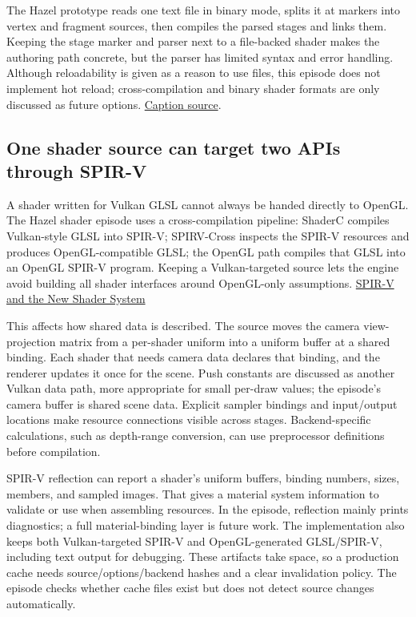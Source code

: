 The Hazel prototype reads one text file in binary mode, splits it at  markers into vertex and fragment sources, then compiles the parsed stages and links them. Keeping the stage marker and parser next to a file-backed shader makes the authoring path concrete, but the parser has limited syntax and error handling. Although reloadability is given as a reason to use files, this episode does not implement hot reload; cross-compilation and binary shader formats are only discussed as future options. \href{https://www.youtube.com/watch?v=8wFEzIYRZXg}{Caption source}.

\subsection{One shader source can target two APIs through SPIR-V}\label{06-engine-ii-ch026-one-shader-source-can-target-two-apis-through-spir-v}

\hypertarget{06-engine-ii-ch026-one-shader-source-can-target-two-apis-through-spir-v}{}

A shader written for Vulkan GLSL cannot always be handed directly to OpenGL. The Hazel shader episode uses a cross-compilation pipeline: ShaderC compiles Vulkan-style GLSL into SPIR-V; SPIRV-Cross inspects the SPIR-V resources and produces OpenGL-compatible GLSL; the OpenGL path compiles that GLSL into an OpenGL SPIR-V program. Keeping a Vulkan-targeted source lets the engine avoid building all shader interfaces around OpenGL-only assumptions. \href{https://www.youtube.com/watch?v=SXDlZRDjtXg}{SPIR-V and the New Shader System}

This affects how shared data is described. The source moves the camera view-projection matrix from a per-shader uniform into a uniform buffer at a shared binding. Each shader that needs camera data declares that binding, and the renderer updates it once for the scene. Push constants are discussed as another Vulkan data path, more appropriate for small per-draw values; the episode's camera buffer is shared scene data. Explicit sampler bindings and input/output locations make resource connections visible across stages. Backend-specific calculations, such as depth-range conversion, can use preprocessor definitions before compilation.

SPIR-V reflection can report a shader's uniform buffers, binding numbers, sizes, members, and sampled images. That gives a material system information to validate or use when assembling resources. In the episode, reflection mainly prints diagnostics; a full material-binding layer is future work. The implementation also keeps both Vulkan-targeted SPIR-V and OpenGL-generated GLSL/SPIR-V, including text output for debugging. These artifacts take space, so a production cache needs source/options/backend hashes and a clear invalidation policy. The episode checks whether cache files exist but does not detect source changes automatically.

